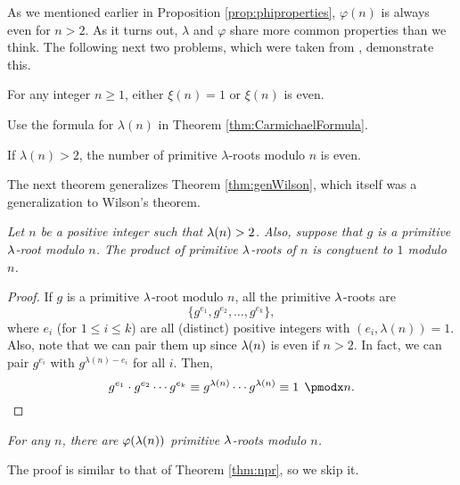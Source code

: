 \documentclass{subfile}
\begin{document}
	As we mentioned earlier in Proposition \ref{prop:phiproperties}, $\varphi(n)$ is always even for $n>2$. As it turns out, $\lambda$ and $\varphi$ share more common properties than we think. The following next two problems, which were taken from \cite{ch:congruence-primitive-lambda}, demonstrate this.
	
	\begin{problem}
		For any integer $n\geq 1$, either $\xi(n)=1$ or $\xi(n)$ is even.
	\end{problem}

	\begin{hint}
		Use the formula for $\lambda(n)$ in Theorem \ref{thm:CarmichaelFormula}.
	\end{hint}

	\begin{problem}
		If $\lambda(n)>2$, the number of primitive $\lambda$-roots modulo $n$ is even.
	\end{problem}

	

	The next theorem generalizes Theorem \ref{thm:genWilson}, which itself was a generalization to Wilson's theorem. 
	\begin{theorem}\slshape
		Let $n$ be a positive integer such that $\lambda(n)>2$. Also, suppose that $g$ is a primitive $\lambda$-root modulo $n$. The product of primitive $\lambda$-roots of $n$ is congtuent to $1$ modulo $n$.
	\end{theorem}
	
	\begin{proof}
		If $g$ is a primitive $\lambda$-root modulo $n$, all the primitive $\lambda$-roots are $$\{g^{e_1}, g^{e_2}, \ldots, g^{e_{k}}\},$$ where $e_i$ (for $1 \leq i \leq k$) are all (distinct) positive integers with $(e_i, \lambda(n))=1$. Also, note that we can pair them up since $\lambda(n)$ is even if $n>2$. In fact, we can pair $g^{e_i}$ with $g^{\lambda(n)-e_i}$ for all $i$. Then,
		\begin{equation*}
		g^{e_1}\cdot g^{e_2}\cdots g^{e_k}  \equiv g^{\l(n)}\cdots g^{\l(n)}  \equiv 1\pmod n. \qedhere
		\end{equation*}
	\end{proof}
	
	\begin{theorem}\slshape
		For any $n$, there are $\varphi(\lambda(n))$ primitive $\lambda$-roots modulo $n$.
	\end{theorem}
	The proof is similar to that of Theorem \ref{thm:npr}, so we skip it.
	
\end{document}
